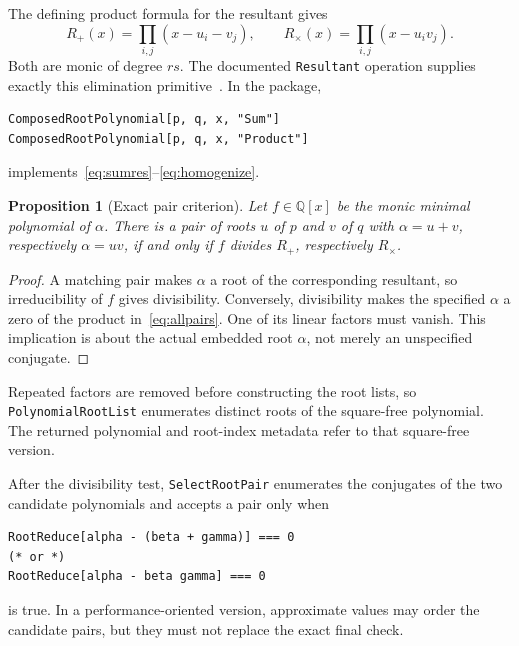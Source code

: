 \documentclass[11pt,letterpaper]{article}
\newtheorem{proposition}[theorem]{Proposition}
\theoremstyle{definition}\newtheorem{definition}[theorem]{Definition}
\theoremstyle{remark}\newtheorem{remark}[theorem]{Remark}
\newcommand{\Q}{\mathbb Q}
\newcommand{\WL}[1]{\texttt{#1}}
\begin{document}
The defining product formula for the resultant gives
\begin{equation}
 R_+(x)=\prod_{i,j}(x-u_i-v_j),\qquad
 R_\times(x)=\prod_{i,j}(x-u_iv_j).
 \label{eq:allpairs}
\end{equation}
Both are monic of degree $rs$. The documented \WL{Resultant} operation supplies exactly this elimination primitive~\cite{resultant}. In the package,
\begin{lstlisting}
ComposedRootPolynomial[p, q, x, "Sum"]
ComposedRootPolynomial[p, q, x, "Product"]
\end{lstlisting}
implements~\eqref{eq:sumres}--\eqref{eq:homogenize}.

\begin{proposition}[Exact pair criterion]
Let $f\in\Q[x]$ be the monic minimal polynomial of $\alpha$. There is a pair of roots $u$ of $p$ and $v$ of $q$ with $\alpha=u+v$, respectively $\alpha=uv$, if and only if $f$ divides $R_+$, respectively $R_\times$.
\end{proposition}
\begin{proof}
A matching pair makes $\alpha$ a root of the corresponding resultant, so irreducibility of $f$ gives divisibility. Conversely, divisibility makes the specified $\alpha$ a zero of the product in~\eqref{eq:allpairs}. One of its linear factors must vanish. This implication is about the actual embedded root $\alpha$, not merely an unspecified conjugate.
\end{proof}

Repeated factors are removed before constructing the root lists, so \WL{PolynomialRootList} enumerates distinct roots of the square-free polynomial. The returned polynomial and root-index metadata refer to that square-free version.

After the divisibility test, \WL{SelectRootPair} enumerates the conjugates of the two candidate polynomials and accepts a pair only when
\begin{lstlisting}
RootReduce[alpha - (beta + gamma)] === 0
(* or *)
RootReduce[alpha - beta gamma] === 0
\end{lstlisting}
is true. In a performance-oriented version, approximate values may order the candidate pairs, but they must not replace the exact final check.
\end{document}
